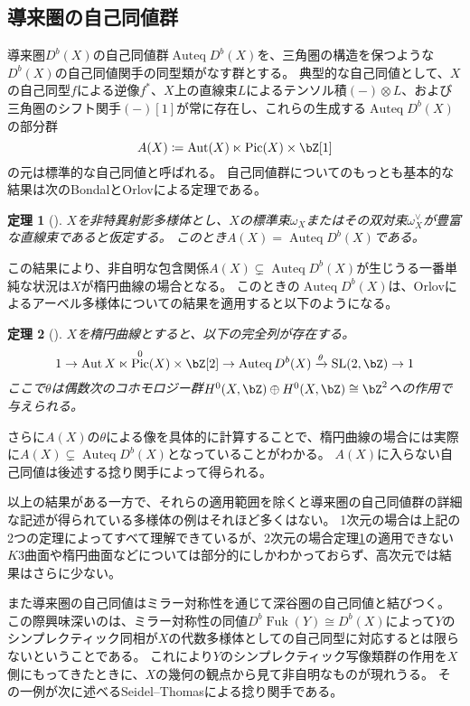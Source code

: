 \documentclass[uplatex,a4paper,dvipdfmx]{jsarticle}
\theoremstyle{plain}
\newtheorem{theorem}{定理}[section]
\theoremstyle{definition}
\DeclareMathOperator{\Auteq}{\mathrm{Auteq}}
\DeclareMathOperator{\Pic}{\mathrm{Pic}}
\DeclareMathOperator{\Aut}{\mathrm{Aut}}
\DeclareMathOperator{\SL}{\mathrm{SL}}
\DeclareMathOperator{\Fuk}{Fuk}
\begin{document}
\subsection{導来圏の自己同値群}
導来圏$D^b(X)$の自己同値群$\Auteq D^b(X)$を、三角圏の構造を保つような$D^b(X)$の自己同値関手の同型類がなす群とする。
典型的な自己同値として、$X$の自己同型$f$による逆像$f^*$、$X$上の直線束$L$によるテンソル積$(-)\otimes L$、および三角圏のシフト関手$(-)[1]$が常に存在し、これらの生成する$\Auteq D^b(X)$の部分群
\begin{equation}
	A(X) \coloneq \Aut(X) \ltimes \Pic(X) \times \bZ[1]
\end{equation}
の元は標準的な自己同値と呼ばれる。
自己同値群についてのもっとも基本的な結果は次のBondalとOrlovによる定理である。
\begin{theorem}[\cite{MR1818984}]\label{BO}
	$X$を非特異射影多様体とし、$X$の標準束$\omega_X$またはその双対束$\omega_X^\vee$が豊富な直線束であると仮定する。
	このとき$A(X) = \Auteq D^b(X)$である。
\end{theorem}
この結果により、非自明な包含関係$A(X) \subsetneq \Auteq D^b(X)$が生じうる一番単純な状況は$X$が楕円曲線の場合となる。
このときの$\Auteq D^b(X)$は、Orlovによるアーベル多様体についての結果\cite{MR1921811}を適用すると以下のようになる。
\begin{theorem}[\cite{MR1921811}]
	$X$を楕円曲線とすると、以下の完全列が存在する。
	\begin{equation}\label{eq:autoequivalence_of_elliptic_curve}
		1 \to \Aut{X} \ltimes \Pic^{0}(X)\times \bZ[2] \to \Auteq{D^b(X)} \xrightarrow{\theta} \SL(2, \bZ) \to 1
	\end{equation}
	ここで$\theta$は偶数次のコホモロジー群$H^0(X, \bZ) \oplus H^0(X, \bZ) \cong \bZ^2$への作用で与えられる。
\end{theorem}

さらに$A(X)$の$\theta$による像を具体的に計算することで、楕円曲線の場合には実際に$A(X) \subsetneq \Auteq D^b(X)$となっていることがわかる。
$A(X)$に入らない自己同値は後述する捻り関手によって得られる。

以上の結果がある一方で、それらの適用範囲を除くと導来圏の自己同値群の詳細な記述が得られている多様体の例はそれほど多くはない。
1次元の場合は上記の2つの定理によってすべて理解できているが、2次元の場合定理\ref{BO}の適用できない$K3$曲面や楕円曲面などについては部分的にしかわかっておらず、高次元では結果はさらに少ない。

また導来圏の自己同値はミラー対称性を通じて深谷圏の自己同値と結びつく。
この際興味深いのは、ミラー対称性の同値$D^b \Fuk(Y) \cong D^b (X)$によって$Y$のシンプレクティック同相が$X$の代数多様体としての自己同型に対応するとは限らないということである。
これにより$Y$のシンプレクティック写像類群の作用を$X$側にもってきたときに、$X$の幾何の観点から見て非自明なものが現れうる。
その一例が次に述べるSeidel--Thomasによる捻り関手である。
\end{document}

